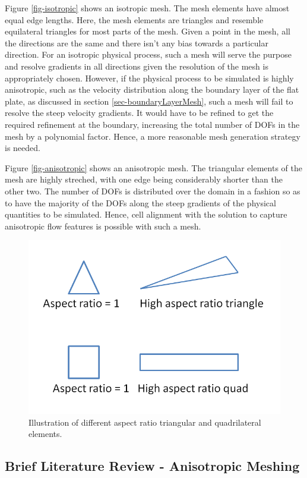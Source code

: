 Figure \ref{fig-isotropic} shows an isotropic mesh. The mesh elements have almost equal edge lengths. Here, the mesh elements are triangles and resemble equilateral triangles for most parts of the mesh. Given a point in the mesh, all the directions are the same and there isn't any bias towards a particular direction. For an isotropic physical process, such a mesh will serve the purpose and resolve gradients in all directions given the resolution of the mesh is appropriately chosen. However, if the physical process to be simulated is highly anisotropic, such as the velocity distribution along the boundary layer of the flat plate, as discussed in section \ref{sec-boundaryLayerMesh}, such a mesh will fail to resolve the steep velocity gradients. It would have to be refined to get the required refinement at the boundary, increasing the total number of DOFs in the mesh by a polynomial factor. Hence, a more reasonable mesh generation strategy is needed.

Figure \ref{fig-anisotropic} shows an anisotropic mesh. The triangular elements of the mesh are highly streched, with one edge being considerably shorter than the other two. The number of DOFs is distributed over the domain in a fashion so as to have the majority of the DOFs along the steep gradients of the physical quantities to be simulated. Hence, cell alignment with the solution to capture anisotropic flow features is possible with such a mesh.

\begin{figure}
	\centering
	\includegraphics[width=0.6\linewidth]{img/intro/aspectRatio.png}
	\caption{Illustration of different aspect ratio triangular and quadrilateral elements.}
\end{figure}

\subsection{Brief Literature Review - Anisotropic Meshing}


